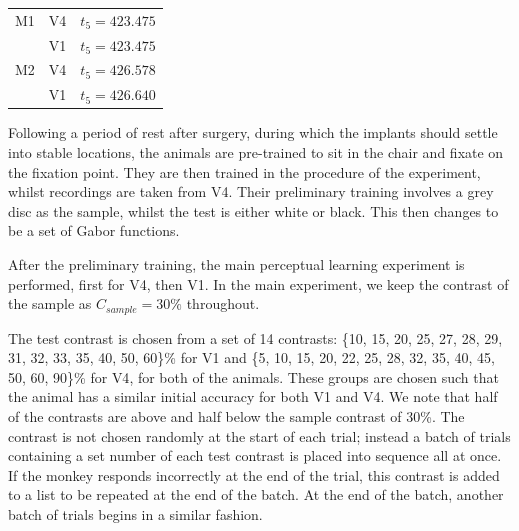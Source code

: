 \begin{table}[hbtp]
\begin{center}
\begin{tabular}{rlr}
\\
\midrule
M1  & V4    & $t_5 = 423.475$
\\
        & V1    & $t_5 = 423.475$
\\
M2    & V4    & $t_5 = 426.578$
\\
        & V1    & $t_5 = 426.640$
\\
\bottomrule
\end{tabular}
\end{center}
\end{table}

Following a period of rest after surgery, during which the implants should settle into stable locations, the animals are pre-trained to sit in the chair and fixate on the fixation point. They are then trained in the procedure of the experiment, whilst recordings are taken from \ac{V4}. Their preliminary training involves a grey disc as the sample, whilst the test is either white or black. This then changes to be a set of Gabor functions.


After the preliminary training, the main perceptual learning experiment is performed, first for \ac{V4}, then \ac{V1}.
In the main experiment, we keep the contrast of the sample as $C_{sample} = 30\%$ throughout.

The test contrast is chosen from a set of 14 contrasts:
\{10, 15, 20, 25, 27, 28, 29, 31, 32, 33, 35, 40, 50, 60\}\% for \ac{V1} and
 \{5, 10, 15, 20, 22, 25, 28, 32, 35, 40, 45, 50, 60, 90\}\% for \ac{V4},
for both of the animals. These groups are chosen such that the animal has a similar initial accuracy for both \ac{V1} and \ac{V4}. We note that half of the contrasts are above and half below the sample contrast of 30\%.
The contrast is not chosen randomly at the start of each trial; instead a batch of trials containing a set number of each test contrast is placed into sequence all at once.
If the monkey responds incorrectly at the end of the trial, this contrast is added to a list to be repeated at the end of the batch.
At the end of the batch, another batch of trials begins in a similar fashion.

